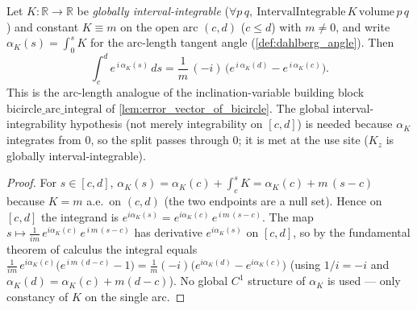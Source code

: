 \begin{lemma}

  \label{lem:arclength_arc_integral}
  Let $K:\mathbb{R}\to\mathbb{R}$ be \emph{globally interval-integrable}
  ($\forall p\,q,\ \mathrm{IntervalIntegrable}\,K\,\mathrm{volume}\,p\,q$) and
  constant $K\equiv m$ on the open arc $(c,d)$ ($c\le d$) with $m\neq0$, and write
  $\alpha_K(s)=\int_0^s K$ for the arc-length tangent angle (\cref{def:dahlberg_angle}).
  Then
  \[
    \int_c^d e^{\,i\,\alpha_K(s)}\,ds
      =\frac{1}{m}\,(-i)\,\bigl(e^{\,i\,\alpha_K(d)}-e^{\,i\,\alpha_K(c)}\bigr).
  \]
  This is the arc-length analogue of the inclination-variable building block
  $\mathrm{bicircle\_arc\_integral}$ of \cref{lem:error_vector_of_bicircle}. The
  global interval-integrability hypothesis (not merely integrability on $[c,d]$) is
  needed because $\alpha_K$ integrates from $0$, so the split passes through $0$; it
  is met at the use site ($K_z$ is globally interval-integrable).
\end{lemma}
\begin{proof}
  \leanok
  For $s\in[c,d]$, $\alpha_K(s)=\alpha_K(c)+\int_c^s K=\alpha_K(c)+m\,(s-c)$ because
  $K=m$ a.e.\ on $(c,d)$ (the two endpoints are a null set). Hence on $[c,d]$ the
  integrand is $e^{i\alpha_K(s)}=e^{i\alpha_K(c)}\,e^{\,i\,m\,(s-c)}$. The map
  $s\mapsto \tfrac{1}{im}\,e^{i\alpha_K(c)}\,e^{\,i\,m\,(s-c)}$ has derivative
  $e^{i\alpha_K(s)}$ on $[c,d]$, so by the fundamental theorem of calculus the
  integral equals
  $\tfrac{1}{im}\,e^{i\alpha_K(c)}\bigl(e^{\,i\,m\,(d-c)}-1\bigr)
   =\tfrac{1}{m}(-i)\bigl(e^{i\alpha_K(d)}-e^{i\alpha_K(c)}\bigr)$
  (using $1/i=-i$ and $\alpha_K(d)=\alpha_K(c)+m(d-c)$). No global $C^1$ structure
  of $\alpha_K$ is used --- only constancy of $K$ on the single arc.
\end{proof}

